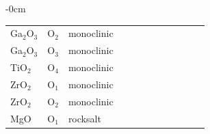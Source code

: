 \begin{table}[H]
\begin{adjustwidth}{-\extralength}{0cm}
\begin{tabular}{lllrrrrrrrrr}
Ga$_2$O$_3$ & O$_2$ & monoclinic & \numScreeningDemoHostsGaTwoOThreeSpaceGroupNumber{} & \numScreeningDemoSitesGaTwoOThreeVaOTwoZeroFirstShellCations{} & \numScreeningDemoSitesGaTwoOThreeVaOTwoZeroFirstShellMeanDistanceA{} & \numScreeningDemoSitesGaTwoOThreeVaOTwoZeroBandGapEV{} & \numScreeningDemoSitesGaTwoOThreeVaOTwoZeroHostFormationEnergyEVPerAtom{} & \numNetScreenGaTwoOThreeOTwoDft{} & \numNetScreenGaTwoOThreeOTwoPred{} & \numNetScreenGaTwoOThreeOTwoErr{} & \numNetScreenGaTwoOThreeOTwoN{} \\
Ga$_2$O$_3$ & O$_3$ & monoclinic & \numScreeningDemoHostsGaTwoOThreeSpaceGroupNumber{} & \numScreeningDemoSitesGaTwoOThreeVaOThreeZeroFirstShellCations{} & \numScreeningDemoSitesGaTwoOThreeVaOThreeZeroFirstShellMeanDistanceA{} & \numScreeningDemoSitesGaTwoOThreeVaOThreeZeroBandGapEV{} & \numScreeningDemoSitesGaTwoOThreeVaOThreeZeroHostFormationEnergyEVPerAtom{} & \numNetScreenGaTwoOThreeOThreeDft{} & \numNetScreenGaTwoOThreeOThreePred{} & \numNetScreenGaTwoOThreeOThreeErr{} & \numNetScreenGaTwoOThreeOThreeN{} \\
TiO$_2$ & O$_4$ & monoclinic & \numScreeningDemoHostsTiOTwoSpaceGroupNumber{} & \numScreeningDemoSitesTiOTwoVaOFourZeroFirstShellCations{} & \numScreeningDemoSitesTiOTwoVaOFourZeroFirstShellMeanDistanceA{} & \numScreeningDemoSitesTiOTwoVaOFourZeroBandGapEV{} & \numScreeningDemoSitesTiOTwoVaOFourZeroHostFormationEnergyEVPerAtom{} & \numNetScreenTiOTwoOFourDft{} & \numNetScreenTiOTwoOFourPred{} & \numNetScreenTiOTwoOFourErr{} & \numNetScreenTiOTwoOFourN{} \\
ZrO$_2$ & O$_1$ & monoclinic & \numScreeningDemoHostsZrOTwoSpaceGroupNumber{} & \numScreeningDemoSitesZrOTwoVaOOneZeroFirstShellCations{} & \numScreeningDemoSitesZrOTwoVaOOneZeroFirstShellMeanDistanceA{} & \numScreeningDemoSitesZrOTwoVaOOneZeroBandGapEV{} & \numScreeningDemoSitesZrOTwoVaOOneZeroHostFormationEnergyEVPerAtom{} & \numNetScreenZrOTwoOOneDft{} & \numNetScreenZrOTwoOOnePred{} & \numNetScreenZrOTwoOOneErr{} & \numNetScreenZrOTwoOOneN{} \\
ZrO$_2$ & O$_2$ & monoclinic & \numScreeningDemoHostsZrOTwoSpaceGroupNumber{} & \numScreeningDemoSitesZrOTwoVaOTwoZeroFirstShellCations{} & \numScreeningDemoSitesZrOTwoVaOTwoZeroFirstShellMeanDistanceA{} & \numScreeningDemoSitesZrOTwoVaOTwoZeroBandGapEV{} & \numScreeningDemoSitesZrOTwoVaOTwoZeroHostFormationEnergyEVPerAtom{} & \numNetScreenZrOTwoOTwoDft{} & \numNetScreenZrOTwoOTwoPred{} & \numNetScreenZrOTwoOTwoErr{} & \numNetScreenZrOTwoOTwoN{} \\
MgO & O$_1$ & rocksalt & \numScreeningDemoHostsMgOSpaceGroupNumber{} & \numScreeningDemoSitesMgOVaOOneZeroFirstShellCations{} & \numScreeningDemoSitesMgOVaOOneZeroFirstShellMeanDistanceA{} & \numScreeningDemoSitesMgOVaOOneZeroBandGapEV{} & \numScreeningDemoSitesMgOVaOOneZeroHostFormationEnergyEVPerAtom{} & \numNetScreenMgOOOneDft{} & \numNetScreenMgOOOnePred{} & \numNetScreenMgOOOneErr{} & \numNetScreenMgOOOneN{} \\

\end{tabular}
\end{adjustwidth}
\end{table}
